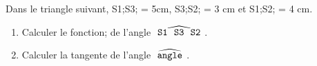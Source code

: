 \documentclass[exercice]{thedocument}%
\begin{document}
%
Dans le triangle suivant, \<S1;\<S3; = 5cm, \<S3;\<S2; = 3 cm et \<S1;\<S2; = 4 cm.\vskip5pt
\vskip5pt
\begin{enumerate}
    \item Calculer le \<fonction; de l'angle $\widehat{\text{\<S1;\<S3;\<S2;}}$.
    \item Calculer la tangente de l'angle $\widehat{\text{\<angle;}}$.
\end{enumerate}
\end{document}
